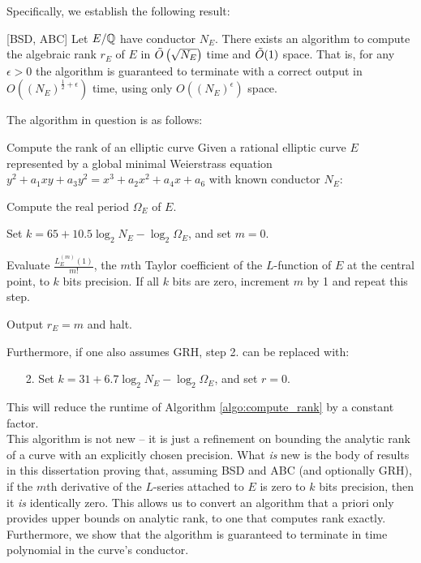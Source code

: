 Specifically, we establish the following result:
\begin{theorem}\label{thm:main_theorem}[BSD, ABC]
Let $E/\mathbb{Q}$ have conductor $N_E$. There exists an algorithm to compute the algebraic rank $r_E$ of $E$ in $\tilde{O}\left(\sqrt{N_E}\right)$ time and $\tilde{O}(1)$ space. That is, for any $\epsilon>0$ the algorithm is guaranteed to terminate with a correct output in $O\left((N_E)^{\frac{1}{2}+\epsilon}\right)$ time, using only $O\left((N_E)^{\epsilon}\right)$ space.
\end{theorem}
The algorithm in question is as follows:
\begin{algorithm}{Compute the rank of an elliptic curve}\label{algo:compute_rank}
Given a rational elliptic curve $E$ represented by a global minimal Weierstrass equation $y^2 + a_1 xy + a_3 y^2 = x^3 + a_2 x^2 + a_4 x + a_6$ with known conductor $N_E$:
\begin{steps}
\item Compute the real period $\Omega_E$ of $E$.
\item Set $k = 65 + 10.5 \log_2 N_E - \log_2 \Omega_E$, and set $m=0$.
\item Evaluate $\frac{L_E^{(m)}(1)}{m!}$, the $m$th Taylor coefficient of the $L$-function of $E$ at the central point, to $k$ bits precision. If all $k$ bits are zero, increment $m$ by 1 and repeat this step.
\item Output $r_E=m$ and halt.
\end{steps}
\end{algorithm}

Furthermore, if one also assumes GRH, step 2. can be replaced with:
\begin{enumerate}
\item[2.] Set $k = 31 + 6.7 \log_2 N_E - \log_2 \Omega_E$, and set $r=0$.
\end{enumerate}
This will reduce the runtime of Algorithm \ref{algo:compute_rank} by a constant factor. \\

This algorithm is not new -- it is just a refinement on bounding the analytic rank of a curve with an explicitly chosen precision. What {\it is} new is the body of results in this dissertation proving that, assuming BSD and ABC (and optionally GRH), if the $m$th derivative of the $L$-series attached to $E$ is zero to $k$ bits precision, then it {\it is} identically zero. This allows us to convert an algorithm that a priori only provides upper bounds on analytic rank, to one that computes rank exactly. Furthermore, we show that the algorithm is guaranteed to terminate in time polynomial in the curve's conductor. \\

